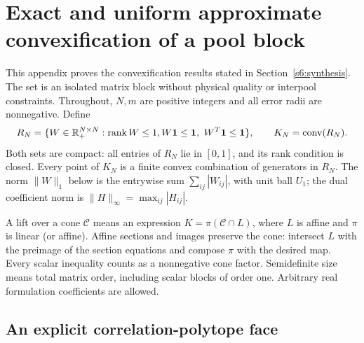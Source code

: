 \section{Exact and uniform approximate convexification of a pool block}
\label{app:convexification}

This appendix proves the convexification results stated in
Section~\ref{s6:synthesis}. The set is an isolated matrix block without
physical quality or interpool constraints. Throughout,
$N,m$ are positive integers and all error radii are nonnegative. Define
\[
 R_N=\{W\in\mathbb R_+^{N\times N}:\operatorname{rank} W\le1,
 W\mathbf1\le\mathbf1,\ W^T\mathbf1\le\mathbf1\},\qquad
 K_N=\operatorname{conv}(R_N).
\]
Both sets are compact: all entries of $R_N$ lie in $[0,1]$, and its
rank condition is closed. Every point of $K_N$ is a finite convex
combination of generators in $R_N$. The norm $\|W\|_1$ below is the
entrywise sum $\sum_{ij}|W_{ij}|$, with unit ball $U_1$; the dual
coefficient norm is $\|H\|_\infty=\max_{ij}|H_{ij}|$.

A lift over a cone $\mathcal C$ means an expression
$K=\pi(\mathcal C\cap L)$, where $L$ is affine and $\pi$ is linear
(or affine). Affine sections and images preserve the cone: intersect
$L$ with the preimage of the section equations and compose $\pi$ with
the desired map. Every scalar inequality counts as a nonnegative cone
factor. Semidefinite size means total matrix order, including scalar
blocks of order one. Arbitrary real formulation coefficients are allowed.

\subsection{An explicit correlation-polytope face}

